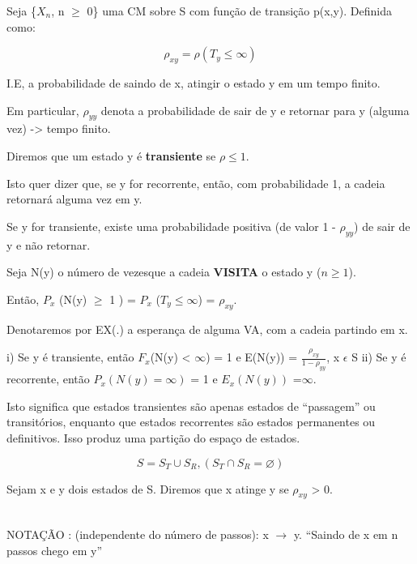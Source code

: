 \documentclass[]{article}
\theoremstyle{definition}
\theoremstyle{definition}
\theoremstyle{definition}
\theoremstyle{remark}
\let\BeginKnitrBlock\begin \let\EndKnitrBlock\end
\begin{document}
Seja \{\(X_n\), n \(\geq\) 0\} uma CM sobre S com função de transição
p(x,y). Definida como:

\[\rho_{xy} = \rho(T_y \leq \infty)\]

I.E, a probabilidade de saindo de x, atingir o estado y em um tempo
finito.

Em particular, \(\rho_{yy}\) denota a probabilidade de sair de y e
retornar para y (alguma vez) -\textgreater{} tempo finito.

\BeginKnitrBlock{definition}
\protect\hypertarget{def:unnamed-chunk-35}{}{\label{def:unnamed-chunk-35}
}Diremos que um estado y é \textbf{transiente} se \(\rho \leq 1\).
\EndKnitrBlock{definition}

Isto quer dizer que, se y for recorrente, então, com probabilidade 1, a
cadeia retornará alguma vez em y.

Se y for transiente, existe uma probabilidade positiva (de valor 1 -
\(\rho_{yy}\)) de sair de y e não retornar.

Seja N(y) o número de vezesque a cadeia \textbf{VISITA} o estado y
(\(n \geq 1\)).

Então, \(P_x\) (N(y) \(\geq\) 1 ) = \(P_x\) (\(T_y \leq \infty\)) =
\(\rho_{xy}\).

Denotaremos por EX(.) a esperança de alguma VA, com a cadeia partindo em
x.

\BeginKnitrBlock{theorem}
\protect\hypertarget{thm:unnamed-chunk-36}{}{\label{thm:unnamed-chunk-36}
}i) Se y é transiente, então \(F_x\)(N(y) \textless{} \(\infty\)) = 1 e
E(N(y)) = \(\frac{\rho_{xy}}{1-\rho_{yy}}\), x \(\epsilon\) S ii) Se y é
recorrente, então \(P_x(N(y) = \infty)\) = 1 e \(E_x(N(y))\)
=\(\infty\).
\EndKnitrBlock{theorem}

Isto significa que estados transientes são apenas estados de
``passagem'' ou transitórios, enquanto que estados recorrentes são
estados permanentes ou definitivos. Isso produz uma partição do espaço
de estados.

\[S = S_T \cup S_R, (S_T \cap S_R = \varnothing)\]

\BeginKnitrBlock{definition}
\protect\hypertarget{def:unnamed-chunk-37}{}{\label{def:unnamed-chunk-37}
}Sejam x e y dois estados de S. Diremos que x atinge y se \(\rho_{xy}\)
\textgreater{} 0.
\EndKnitrBlock{definition}\\
NOTAÇÃO : (independente do número de passos): x \(\rightarrow\) y.
``Saindo de x em n passos chego em y''
\end{document}
